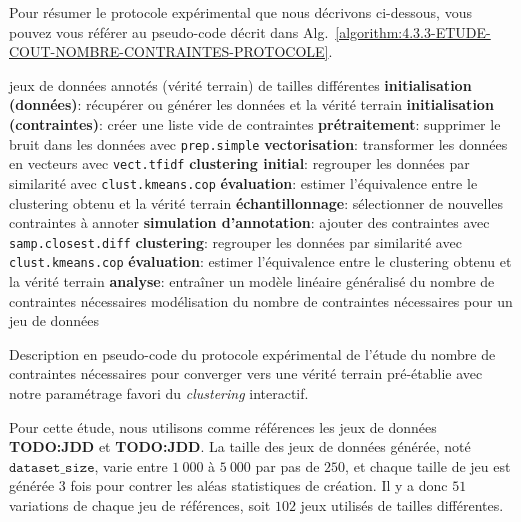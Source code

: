 			Pour résumer le protocole expérimental que nous décrivons ci-dessous, vous pouvez vous référer au pseudo-code décrit dans Alg.~\ref{algorithm:4.3.3-ETUDE-COUT-NOMBRE-CONTRAINTES-PROTOCOLE}.
			\begin{algorithm}[!htb]
				\begin{algorithmic}[1]
					\Require jeux de données annotés (vérité terrain) de tailles différentes
						\State \textbf{initialisation (données)}: récupérer ou générer les données et la vérité terrain
						\State \textbf{initialisation (contraintes)}: créer une liste vide de contraintes
						\State \textbf{prétraitement}: supprimer le bruit dans les données avec \texttt{prep.simple}
						\State \textbf{vectorisation}: transformer les données en vecteurs avec \texttt{vect.tfidf}
						\State \textbf{clustering initial}: regrouper les données par similarité avec \texttt{clust.kmeans.cop}
						\State \textbf{évaluation}: estimer l'équivalence entre le clustering obtenu et la vérité terrain
						\Repeat
							\State \textbf{échantillonnage}: sélectionner de nouvelles contraintes à annoter
							\State \textbf{simulation d'annotation}: ajouter des contraintes avec \texttt{samp.closest.diff}
							\State \textbf{clustering}: regrouper les données par similarité avec \texttt{clust.kmeans.cop}
							\State \textbf{évaluation}: estimer l'équivalence entre le clustering obtenu et la vérité terrain
					\EndFor						
					\State \textbf{analyse}: entraîner un modèle linéaire généralisé du nombre de contraintes nécessaires
					\Ensure modélisation du nombre de contraintes nécessaires pour un jeu de données
				\end{algorithmic}
				\caption{Description en pseudo-code du protocole expérimental de l'étude du nombre de contraintes nécessaires pour converger vers une vérité terrain pré-établie avec notre paramétrage favori du \textit{clustering} interactif.}
				\label{algorithm:4.3.3-ETUDE-COUT-NOMBRE-CONTRAINTES-PROTOCOLE}
			\end{algorithm}
			
			Pour cette étude, nous utilisons comme références les jeux de données \textbf{TODO:JDD} et \textbf{TODO:JDD}.
			La taille des jeux de données générée, noté $\texttt{dataset\_size}$, varie entre $1~000$ à $5~000$ par pas de $250$, et chaque taille de jeu est générée $3$ fois pour contrer les aléas statistiques de création.
			Il y a donc $51$ variations de chaque jeu de références, soit $102$ jeux utilisés de tailles différentes.
			
